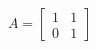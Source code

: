 \documentclass[preview]{standalone}
\begin{document}
\begin{align*}
A = \begin{bmatrix} 1 & 1 \\ 0 & 1 \end{bmatrix}
\end{align*}
\end{document}
